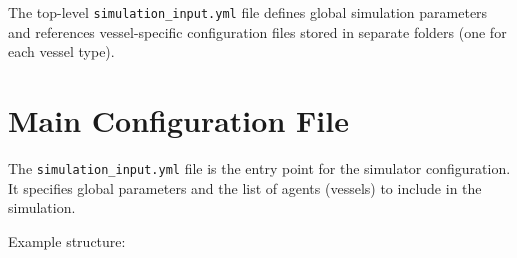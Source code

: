 \documentclass[
  letterpaper,
  DIV=11,
  numbers=noendperiod]{scrreprt}
\begin{document}
The top-level \texttt{simulation\_input.yml} file defines global
simulation parameters and references vessel-specific configuration files
stored in separate folders (one for each vessel type).

\section*{Main Configuration File}\label{main-configuration-file}


The \texttt{simulation\_input.yml} file is the entry point for the
simulator configuration. It specifies global parameters and the list of
agents (vessels) to include in the simulation.

Example structure:
\end{document}
